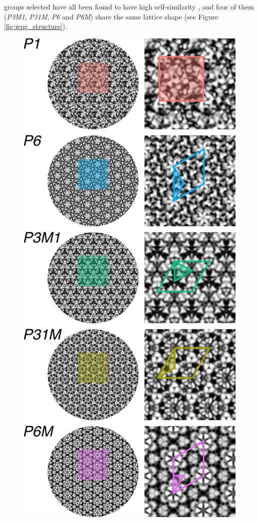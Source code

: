 \documentclass[symmetry,article,accept,pdftex,moreauthors]{Definitions/mdpi}
\begin{document}
groups selected have all been found to have high self-similarity \citep{RN172}, and four of them (\textit{P3M1}, \textit{P31M}, \textit{P6} and \textit{P6M}) share the same lattice shape (see Figure \ref{fig:wpg_structure}). %

\begin{figure}[H]

	\includegraphics[scale=0.3]{./figures/wpg_structure.pdf}

\end{figure}
\end{document}
